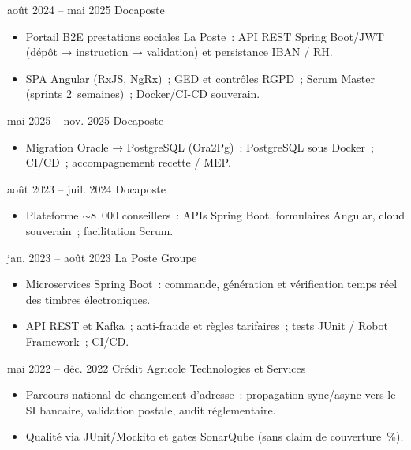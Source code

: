 \documentclass[a4paper,10pt]{article}
\begin{document}
  {août 2024 – mai 2025}
  {Docaposte}
  {\begin{itemize}
    \item Portail B2E prestations sociales La Poste~: API REST Spring Boot/JWT (dépôt → instruction → validation) et persistance IBAN / RH.
    \item SPA Angular (RxJS, NgRx)~; GED et contrôles RGPD~; Scrum Master (sprints 2~semaines)~; Docker/CI-CD souverain.
  \end{itemize}}

  {mai 2025 – nov. 2025}
  {Docaposte}
  {\begin{itemize}
    \item Migration Oracle → PostgreSQL (Ora2Pg)~; PostgreSQL sous Docker~; CI/CD~; accompagnement recette / MEP.
  \end{itemize}}

  {août 2023 – juil. 2024}
  {Docaposte}
  {\begin{itemize}
    \item Plateforme $\sim$8~000 conseillers~: APIs Spring Boot, formulaires Angular, cloud souverain~; facilitation Scrum.
  \end{itemize}}

  {jan. 2023 – août 2023}
  {La Poste Groupe}
  {\begin{itemize}
    \item Microservices Spring Boot~: commande, génération et vérification temps réel des timbres électroniques.
    \item API REST et Kafka~; anti-fraude et règles tarifaires~; tests JUnit / Robot Framework~; CI/CD.
  \end{itemize}}

  {mai 2022 – déc. 2022}
  {Crédit Agricole Technologies et Services}
  {\begin{itemize}
    \item Parcours national de changement d'adresse~: propagation sync/async vers le SI bancaire, validation postale, audit réglementaire.
    \item Qualité via JUnit/Mockito et gates SonarQube (sans claim de couverture~\%).
  \end{itemize}}
\end{document}

